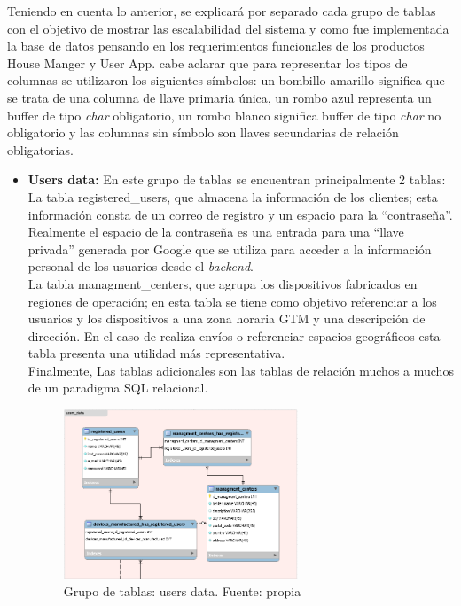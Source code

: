 Teniendo en cuenta lo anterior, se explicará por separado cada grupo de tablas con el objetivo de mostrar las escalabilidad del sistema y como fue implementada la base de datos pensando en los requerimientos funcionales de los productos House Manger y User App. cabe aclarar que para representar los tipos de columnas se utilizaron los siguientes símbolos: un bombillo amarillo significa que se trata de una columna de llave primaria única, un rombo azul representa un buffer de tipo \textit{char} obligatorio, un rombo blanco significa buffer de tipo \textit{char} no obligatorio y las columnas sin símbolo son llaves secundarias de relación obligatorias.


\begin{itemize}
	
	\item \textbf{Users data:} En este grupo de tablas se encuentran principalmente 2 tablas:
	\vspace{0.5cm}\\
	La tabla registered\_users, que almacena la información de los clientes; esta información consta de un correo de registro y un espacio para la ``contraseña''. Realmente el espacio de la contraseña es una entrada para una ``llave privada'' generada por Google que se utiliza para acceder a la información personal de los usuarios desde el \textit{backend}. 
	\vspace{0.5cm}\\
	La tabla managment\_centers, que agrupa los dispositivos fabricados en regiones de operación; en esta tabla se tiene como objetivo referenciar a los usuarios y los dispositivos a una zona horaria GTM y una descripción de dirección. En el caso de realiza envíos o referenciar espacios geográficos esta tabla presenta una utilidad más representativa.
	\vspace{0.5cm}\\
	Finalmente, Las tablas adicionales son las tablas de relación muchos a muchos de un paradigma SQL relacional.
	
	\begin{figure}[htbp]
		\centerline{\includegraphics[width=7cm]{figuras/users_data.png}}
		\caption{Grupo de tablas: users data. Fuente: propia}
		\label{fig_25}
	\end{figure}
	

\end{itemize}
